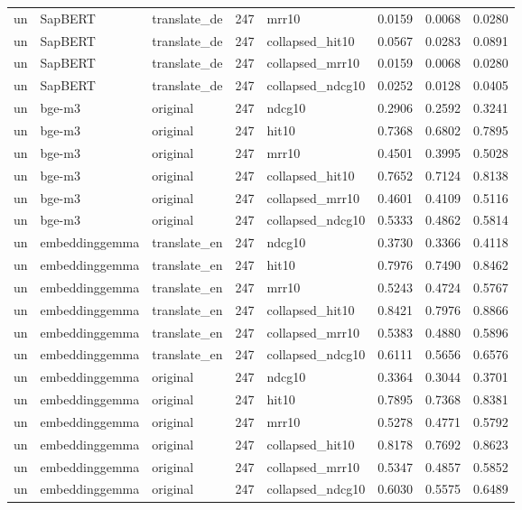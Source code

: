 \begin{tabular}{lllrlrrr}
un & SapBERT & translate\_de & 247 & mrr10 & 0.0159 & 0.0068 & 0.0280 \\
un & SapBERT & translate\_de & 247 & collapsed\_hit10 & 0.0567 & 0.0283 & 0.0891 \\
un & SapBERT & translate\_de & 247 & collapsed\_mrr10 & 0.0159 & 0.0068 & 0.0280 \\
un & SapBERT & translate\_de & 247 & collapsed\_ndcg10 & 0.0252 & 0.0128 & 0.0405 \\
un & bge-m3 & original & 247 & ndcg10 & 0.2906 & 0.2592 & 0.3241 \\
un & bge-m3 & original & 247 & hit10 & 0.7368 & 0.6802 & 0.7895 \\
un & bge-m3 & original & 247 & mrr10 & 0.4501 & 0.3995 & 0.5028 \\
un & bge-m3 & original & 247 & collapsed\_hit10 & 0.7652 & 0.7124 & 0.8138 \\
un & bge-m3 & original & 247 & collapsed\_mrr10 & 0.4601 & 0.4109 & 0.5116 \\
un & bge-m3 & original & 247 & collapsed\_ndcg10 & 0.5333 & 0.4862 & 0.5814 \\
un & embeddinggemma & translate\_en & 247 & ndcg10 & 0.3730 & 0.3366 & 0.4118 \\
un & embeddinggemma & translate\_en & 247 & hit10 & 0.7976 & 0.7490 & 0.8462 \\
un & embeddinggemma & translate\_en & 247 & mrr10 & 0.5243 & 0.4724 & 0.5767 \\
un & embeddinggemma & translate\_en & 247 & collapsed\_hit10 & 0.8421 & 0.7976 & 0.8866 \\
un & embeddinggemma & translate\_en & 247 & collapsed\_mrr10 & 0.5383 & 0.4880 & 0.5896 \\
un & embeddinggemma & translate\_en & 247 & collapsed\_ndcg10 & 0.6111 & 0.5656 & 0.6576 \\
un & embeddinggemma & original & 247 & ndcg10 & 0.3364 & 0.3044 & 0.3701 \\
un & embeddinggemma & original & 247 & hit10 & 0.7895 & 0.7368 & 0.8381 \\
un & embeddinggemma & original & 247 & mrr10 & 0.5278 & 0.4771 & 0.5792 \\
un & embeddinggemma & original & 247 & collapsed\_hit10 & 0.8178 & 0.7692 & 0.8623 \\
un & embeddinggemma & original & 247 & collapsed\_mrr10 & 0.5347 & 0.4857 & 0.5852 \\
un & embeddinggemma & original & 247 & collapsed\_ndcg10 & 0.6030 & 0.5575 & 0.6489 \\

\end{tabular}
